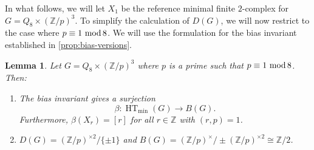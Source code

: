 \documentclass[11pt,a4paper,leqno]{amsart}
\newtheorem{lemma}[theorem]{Lemma}
\theoremstyle{definition}
\theoremstyle{remark}
\newenvironment{clist}[1]
{\begin{enumerate}[\normalfont #1]}
{\end{enumerate}}
\newcommand{\Z}{\mathbb{Z}}
\renewcommand{\mod}{\,\,\text{\normalfont mod}\,}
\DeclareMathOperator{\HT}{HT}
\begin{document}
In what follows, we will let $X_1$ be the reference minimal finite $2$-complex for $G = Q_8 \times (\Z/p)^3$. To simplify the calculation of $D(G)$, we will now restrict to the case where $p \equiv 1 \mod 8$. We will use the formulation for the bias invariant established in \cref{prop:bias-versions}.

\begin{lemma} \label{lemma:Q8-bias-surj}
Let $G = Q_8 \times (\Z/p)^3$ where $p$ is a prime such that $p \equiv 1 \mod 8$. Then:
\begin{clist}{(i)}
\item
The bias invariant gives a surjection 
\[ \beta\colon\HT_{\min}(G) \to B(G).\] 
Furthermore, $\beta(X_r) = [r]$ for all $r \in \Z$ with $(r,p)=1$.
\item
$D(G) = (\Z/p)^{\times 2}/\{\pm 1\}$ and $B(G) = (\Z/p)^\times/\pm(\Z/p)^{\times 2} \cong \Z/2$.
\end{clist}
\end{lemma}
\end{document}

